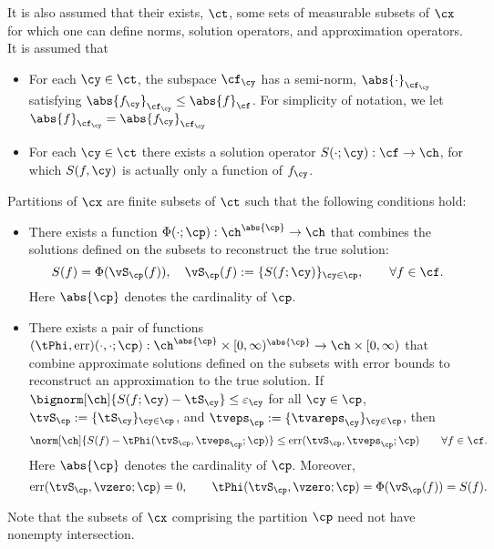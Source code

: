 \documentclass[]{elsarticle}
\DeclareMathOperator{\err}{err}
\theoremstyle{definition}
\theoremstyle{remark}
\newcommand{\Fnorm}[1]{\abs{#1}_{\cf}}
\newcommand{\FYnorm}[1]{\abs{#1}_{\cf_\cy}}
\newcommand{\Hnorm}[1]{\norm[\ch]{#1}}
\begin{document}
It is also assumed that their exists, $\ct$, some sets of measurable subsets of $\cx$ for which one can define norms, solution operators, and approximation operators.  It is assumed that
\begin{itemize}
\item For each $\cy \in \ct$, the subspace  $\cf_{\cy}$ has a semi-norm, $\FYnorm{\cdot}$ satisfying $\FYnorm{f_{\cy}} \le \Fnorm{f}$. For simplicity of notation, we let $\FYnorm{f} = \FYnorm{f_{\cy}}$

\item For each $\cy \in \ct$ there exists a solution operator $S(\cdot;\cy) : \cf \to \ch$, for which $S(f,\cy)$ is actually only a function of $f_{\cy}$.

\end{itemize}
Partitions of $\cx$ are finite subsets of $\ct$ such that the following conditions hold:
\begin{itemize}
\item There exists a function $\Phi(\cdot; \cp): \ch^{\abs{\cp}} \to \ch$ that combines the solutions defined on the subsets to reconstruct the true solution:
\[
S(f) = \Phi(\vS_{\cp}(f)), \quad \vS_{\cp}(f):= \{S(f;\cy)\}_{\cy \in \cp}, \qquad \forall f \in \cf.
\]
Here $\abs{\cp}$ denotes the cardinality of $\cp$.

\item There exists a pair of functions $(\tPhi,\err)(\cdot,\cdot; \cp): \ch^{\abs{\cp}} \times [0,\infty)^{\abs{\cp}} \to \ch \times [0,\infty)$ that combine approximate solutions defined on the subsets with error bounds to reconstruct an approximation to the true solution. If $\bignorm[\ch]{S(f;\cy) - \tS_{\cy}} \le \varepsilon_{\cy}$ for all $\cy \in \cp$, $\tvS_{\cp} := \{\tS_{\cy}\}_{\cy \in \cp}$,  and $\tveps_{\cp} := \{\tvareps_{\cy}\}_{\cy \in \cp}$, then
\begin{equation*}
\Hnorm{S(f) -  \tPhi(\tvS_{\cp}, \tveps_{\cp} ;\cp)} \le \err(\tvS_{\cp}, \tveps_{\cp} ;\cp) \qquad \forall f \in \cf.
\end{equation*}
Here $\abs{\cp}$ denotes the cardinality of $\cp$. Moreover,
\[
\err(\tvS_{\cp}, \vzero ;\cp) = 0, \qquad \tPhi(\tvS_{\cp}, \vzero ;\cp) = \Phi(\vS_{\cp}(f)) = S(f).
\]
\end{itemize}
Note that the subsets of $\cx$ comprising the partition $\cp$ need not have nonempty intersection.
\end{document}
